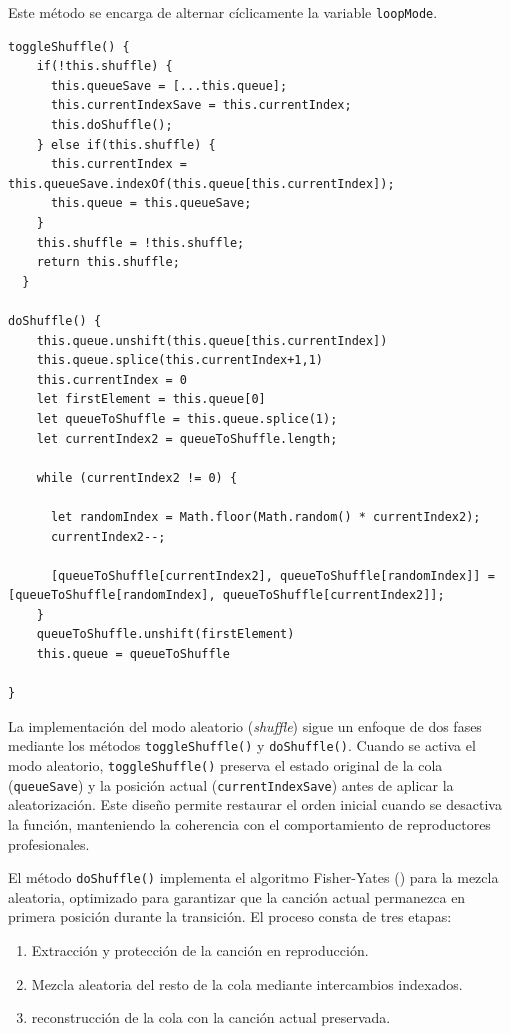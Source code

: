 \documentclass[11pt, a4paper]{article}
\begin{document}
                Este método se encarga de alternar cíclicamente la variable \verb|loopMode|.

                \begin{lstlisting}[caption={Shuffle}]
toggleShuffle() {
    if(!this.shuffle) {
      this.queueSave = [...this.queue];
      this.currentIndexSave = this.currentIndex;
      this.doShuffle();
    } else if(this.shuffle) {
      this.currentIndex = this.queueSave.indexOf(this.queue[this.currentIndex]);
      this.queue = this.queueSave;
    }
    this.shuffle = !this.shuffle;
    return this.shuffle;
  }

doShuffle() {
    this.queue.unshift(this.queue[this.currentIndex])
    this.queue.splice(this.currentIndex+1,1)
    this.currentIndex = 0
    let firstElement = this.queue[0]
    let queueToShuffle = this.queue.splice(1);
    let currentIndex2 = queueToShuffle.length;

    while (currentIndex2 != 0) {

      let randomIndex = Math.floor(Math.random() * currentIndex2);
      currentIndex2--;

      [queueToShuffle[currentIndex2], queueToShuffle[randomIndex]] = [queueToShuffle[randomIndex], queueToShuffle[currentIndex2]];
    }
    queueToShuffle.unshift(firstElement)
    this.queue = queueToShuffle
    
}
                \end{lstlisting}

                La implementación del modo aleatorio (\textit{shuffle}) sigue un enfoque de dos fases mediante los métodos \verb|toggleShuffle()| y \verb|doShuffle()|. Cuando se activa el modo aleatorio, \verb|toggleShuffle()| preserva el estado original de la cola (\verb|queueSave|) y la posición actual (\verb|currentIndexSave|) antes de aplicar la aleatorización. Este diseño permite restaurar el orden inicial cuando se desactiva la función, manteniendo la coherencia con el comportamiento de reproductores profesionales.

                El método \verb|doShuffle()| implementa el algoritmo Fisher-Yates (\textcite{wikifisheryates}) para la mezcla aleatoria, optimizado para garantizar que la canción actual permanezca en primera posición durante la transición. El proceso consta de tres etapas: \begin{enumerate}
                  \item Extracción y protección de la canción en reproducción.
                  \item Mezcla aleatoria del resto de la cola mediante intercambios indexados.
                  \item reconstrucción de la cola con la canción actual preservada.
                \end{enumerate}
                
\end{document}
